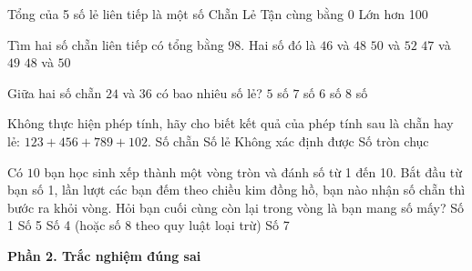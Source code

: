 \begin{ex} %
Tổng của 5 số lẻ liên tiếp là một số
\choice
{Chẵn}
{\True Lẻ}
{Tận cùng bằng 0}
{Lớn hơn 100}
\end{ex}

\begin{ex} %
Tìm hai số chẵn liên tiếp có tổng bằng $98$. Hai số đó là
\choice
{$46$ và $48$}
{$50$ và $52$}
{$47$ và $49$}
{\True $48$ và $50$}
\end{ex}

\begin{ex} %
Giữa hai số chẵn $24$ và $36$ có bao nhiêu số lẻ?
\choice
{$5$ số}
{$7$ số}
{\True $6$ số}
{$8$ số}
\end{ex}

\begin{ex} %
Không thực hiện phép tính, hãy cho biết kết quả của phép tính sau là chẵn hay lẻ: $123 + 456 + 789 + 102$.
\choice
{\True Số chẵn}
{Số lẻ}
{Không xác định được}
{Số tròn chục}
\end{ex}

\begin{ex} %
Có $10$ bạn học sinh xếp thành một vòng tròn và đánh số từ 1 đến 10. Bắt đầu từ bạn số 1, lần lượt các bạn đếm theo chiều kim đồng hồ, bạn nào nhận số chẵn thì bước ra khỏi vòng. Hỏi bạn cuối cùng còn lại trong vòng là bạn mang số mấy?
\choice
{Số 1}
{Số 5}
{\True Số 4 (hoặc số 8 theo quy luật loại trừ)}
{Số 7}
\end{ex}

\textbf{Phần 2. Trắc nghiệm đúng sai}

